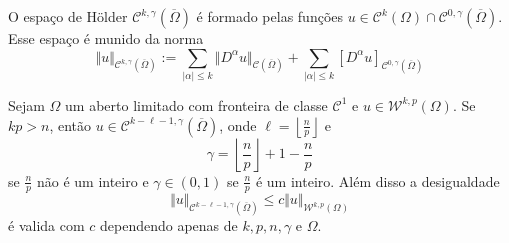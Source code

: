 \documentclass[a4paper, 11pt]{book}
\theoremstyle{definition}
\newcommand{\cC}{\mathcal{C}}
\newcommand{\cW}{\mathcal{W}}
\begin{document}
\begin{dbox}
    O espaço de Hölder $\cC^{k,\gamma}(\overline\Omega)$ é formado pelas funções $u \in \cC^k(\Omega) \cap \cC^{0,\gamma}(\overline\Omega)$. Esse espaço é munido da norma
    \[
        \Vert u \Vert_{\cC^{k,\gamma}(\overline\Omega)} := \sum_{|\alpha| \leqslant k} \Vert D^{\alpha}u \Vert_{\cC(\overline\Omega)} + \sum_{|\alpha| \leqslant k} [D^\alpha u]_{\cC^{0,\gamma}(\overline\Omega)}
    \] 
\end{dbox}

\begin{tbox}
    Sejam $\Omega$ um aberto limitado com fronteira de classe $\cC^1$ e $u \in \cW^{k,p}(\Omega)$. 
    Se $kp > n$, então $u \in \cC^{k - \ell - 1,\gamma}(\overline\Omega)$, onde $\ell = \left\lfloor \frac{n}{p} \right\rfloor$ e
    \[
        \gamma = \left\lfloor \frac{n}{p} \right\rfloor + 1 - \frac{n}{p}
    \]
    se $\frac{n}{p}$ não é um inteiro e $\gamma \in (0,1)$ se $\frac{n}{p}$ é um inteiro.
    Além disso a desigualdade
    \[
        \Vert u \Vert_{\cC^{k - \ell - 1,\gamma}(\overline\Omega)} \leqslant c \Vert u \Vert_{\cW^{k,p}(\Omega)}
    \]
    é valida com $c$ dependendo apenas de $k, p, n, \gamma$ e $\Omega$.
\end{tbox}
\end{document}
